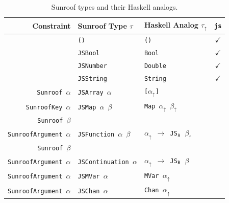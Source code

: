 \documentclass{llncs}
\newcommand{\HaskellAnalog}[1]{#1\ensuremath{_\uparrow}}
\newcommand{\Src}[1]{{\tt{#1}}}
\begin{document}
\begin{table}[t]
\begin{center}
\begin{tabular}{r@{\quad}l@{\quad}l@{\quad}c}
\hline\rule{0pt}{12pt}%
  Constraint
  & Sunroof Type $\tau$
  & Haskell Analog \HaskellAnalog{$\tau$}
  & \Src{js} \\ \hline\rule{0pt}{12pt}%
  
  & \Src{()}       & \Src{()}     & $\checkmark$ \\
  & \Src{JSBool}   & \Src{Bool}   & $\checkmark$ \\
  & \Src{JSNumber} & \Src{Double} & $\checkmark$ \\
  & \Src{JSString} & \Src{String} & $\checkmark$ \\
  
  \Src{Sunroof $\alpha$}
  & \Src{JSArray $\alpha$} 
  & \Src{[$\HaskellAnalog{\alpha}$]}
  & \\
  
  \Src{SunroofKey $\alpha$}
  & \Src{JSMap $\alpha$ $\beta$}
  & \Src{Map $\HaskellAnalog{\alpha}$ $\HaskellAnalog{\beta}$}
  & \\
  \Src{Sunroof $\beta$} \\
  
  \Src{SunroofArgument $\alpha$}
  & \Src{JSFunction $\alpha$ $\beta$ }
  & \Src{$\HaskellAnalog{\alpha}$ $\rightarrow$ JS$_\Src{A}$ $\HaskellAnalog{\beta}$} 
  & \\
  \Src{Sunroof $\beta$} \\

  \Src{SunroofArgument $\alpha$}
  & \Src{JSContinuation $\alpha$}
  & \Src{$\HaskellAnalog{\alpha}$ $\rightarrow$ JS$_\Src{B}$ $\beta$} 
  & \\
  
  \Src{SunroofArgument $\alpha$}
  & \Src{JSMVar $\alpha$}
  & \Src{MVar $\HaskellAnalog{\alpha}$}
  & \\
  
  \Src{SunroofArgument $\alpha$}
  & \Src{JSChan $\alpha$}
  & \Src{Chan $\HaskellAnalog{\alpha}$}
  & \\[2pt]
\hline
\end{tabular}
\end{center}
\caption{Sunroof types and their Haskell analogs.}
\vspace{-0.2in}
\label{tab:sunroof-types}
\end{table} 
\end{document}
